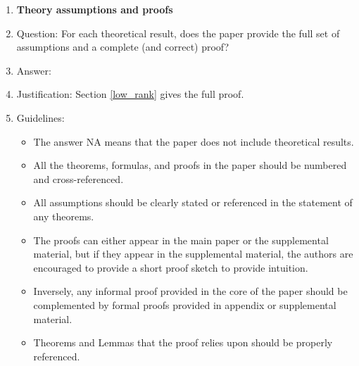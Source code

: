 \documentclass{article}
\begin{document}
\begin{enumerate}
\item {\bf Theory assumptions and proofs}
    \item[] Question: For each theoretical result, does the paper provide the full set of assumptions and a complete (and correct) proof?
    \item[] Answer: \answerYes{} %
    \item[] Justification: Section \ref{low_rank} gives the full proof.
    \item[] Guidelines:
    \begin{itemize}
        \item The answer NA means that the paper does not include theoretical results. 
        \item All the theorems, formulas, and proofs in the paper should be numbered and cross-referenced.
        \item All assumptions should be clearly stated or referenced in the statement of any theorems.
        \item The proofs can either appear in the main paper or the supplemental material, but if they appear in the supplemental material, the authors are encouraged to provide a short proof sketch to provide intuition. 
        \item Inversely, any informal proof provided in the core of the paper should be complemented by formal proofs provided in appendix or supplemental material.
        \item Theorems and Lemmas that the proof relies upon should be properly referenced. 
    \end{itemize}


\end{enumerate}
\end{document}
